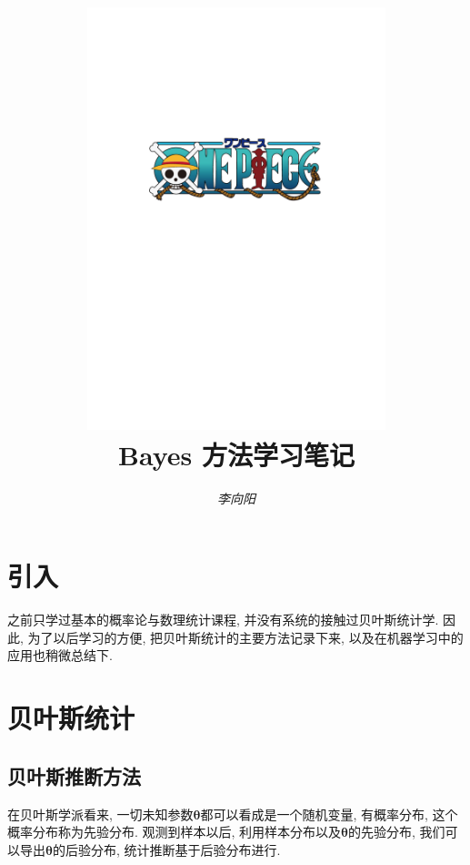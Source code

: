 \documentclass[a4paper,UTF8]{ctexart}
\theoremstyle{plain} \newtheorem{theorem}{定理}[section]
\theoremstyle{plain} \newtheorem{definition}{定义}[section]
\theoremstyle{plain} \newtheorem{lemma}{引理}[section]
\theoremstyle{plain} \newtheorem{proposition}{命题}[section]
\theoremstyle{plain} \newtheorem{example}{例}[section]
\theoremstyle{plain} \newtheorem{remark}{注}[section]
\theoremstyle{plain} \newtheorem{corollary}{推论}[section]
\begin{document}
\title{
\includegraphics[width=0.65\textwidth]{onepiece.pdf}\\
\vspace{2em}
\textbf{Bayes 方法学习笔记}}
\author{\emph{李向阳}  }
\date{}


\maketitle
\thispagestyle{empty}

\newpage


\tableofcontents

\newpage

\section{引入}
之前只学过基本的概率论与数理统计课程, 并没有系统的接触过贝叶斯统计学. 因此, 为了以后学习的方便, 把贝叶斯统计的主要方法记录下来, 以及在机器学习中的应用也稍微总结下.


\section{贝叶斯统计}
\subsection{贝叶斯推断方法}
在贝叶斯学派看来, 一切未知参数$\bm{\theta}$都可以看成是一个随机变量, 有概率分布, 这个概率分布称为先验分布. 观测到样本以后, 利用样本分布以及$\bm{\theta}$的先验分布, 我们可以导出$\bm{\theta}$的后验分布, 统计推断基于后验分布进行.
\end{document}
